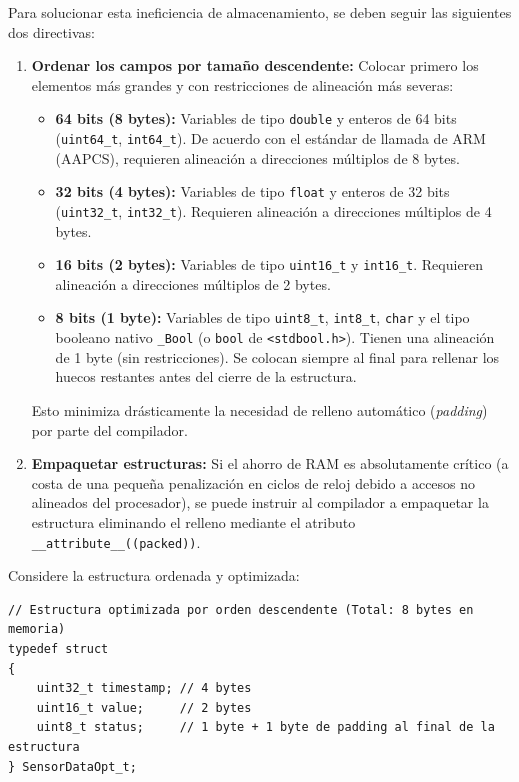 \documentclass[
10pt, %
a4paper, %
oneside, %
headinclude,footinclude, %
BCOR5mm, %
]{scrartcl}
\begin{document}
Para solucionar esta ineficiencia de almacenamiento, se deben seguir las siguientes dos directivas:

\begin{enumerate}
	\item \textbf{Ordenar los campos por tamaño descendente:} Colocar primero los elementos más grandes y con restricciones de alineación más severas:
	\begin{itemize}
		\item \textbf{64 bits (8 bytes):} Variables de tipo \texttt{double} y enteros de 64 bits (\texttt{uint64\_t}, \texttt{int64\_t}). De acuerdo con el estándar de llamada de ARM (AAPCS), requieren alineación a direcciones múltiplos de 8 bytes.
		\item \textbf{32 bits (4 bytes):} Variables de tipo \texttt{float} y enteros de 32 bits (\texttt{uint32\_t}, \texttt{int32\_t}). Requieren alineación a direcciones múltiplos de 4 bytes.
		\item \textbf{16 bits (2 bytes):} Variables de tipo \texttt{uint16\_t} y \texttt{int16\_t}. Requieren alineación a direcciones múltiplos de 2 bytes.
		\item \textbf{8 bits (1 byte):} Variables de tipo \texttt{uint8\_t}, \texttt{int8\_t}, \texttt{char} y el tipo booleano nativo \texttt{\_Bool} (o \texttt{bool} de \texttt{<stdbool.h>}). Tienen una alineación de 1 byte (sin restricciones). Se colocan siempre al final para rellenar los huecos restantes antes del cierre de la estructura.
	\end{itemize}
	Esto minimiza drásticamente la necesidad de relleno automático (\textit{padding}) por parte del compilador.
	\item \textbf{Empaquetar estructuras:} Si el ahorro de RAM es absolutamente crítico (a costa de una pequeña penalización en ciclos de reloj debido a accesos no alineados del procesador), se puede instruir al compilador a empaquetar la estructura eliminando el relleno mediante el atributo \texttt{\_\_attribute\_\_((packed))}.
\end{enumerate}

Considere la estructura ordenada y optimizada:

\begin{lstlisting}[style=CMakeStyle]
// Estructura optimizada por orden descendente (Total: 8 bytes en memoria)
typedef struct
{
    uint32_t timestamp; // 4 bytes
    uint16_t value;     // 2 bytes
    uint8_t status;     // 1 byte + 1 byte de padding al final de la estructura
} SensorDataOpt_t;
\end{lstlisting}
\end{document}
